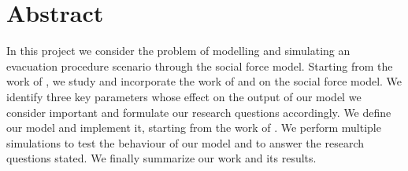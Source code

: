 \section{Abstract} \label{sec:1-abstract}
In this project we consider the problem of modelling and simulating an evacuation procedure scenario through the social force model. Starting from the work of \citet{Helbing2000}, we study and incorporate the work of \citet{Zainuddin2010} and \citet{Wang2016} on the social force model. We identify three key parameters whose effect on the output of our model we consider important and formulate our research questions accordingly. We define our model and implement it, starting from the work of \citet{Hardmeier2012}. We perform multiple simulations to test the behaviour of our model and to answer the research questions stated. We finally summarize our work and its results.

